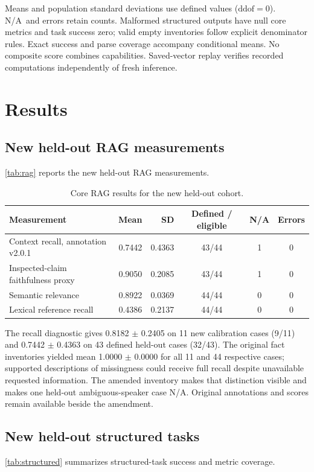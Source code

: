 \documentclass{amsart}
\theoremstyle{definition}
\numberwithin{equation}{section}
\newcommand{\NAAA}{\textnormal{N/A}}
\begin{document}
Means and population standard deviations use defined values ($\mathrm{ddof}=0$).
\NAAA\ and errors retain counts. Malformed structured outputs have null core
metrics and task success zero; valid empty inventories follow explicit denominator
rules. Exact success and parse coverage accompany conditional means. No composite
score combines capabilities. Saved-vector replay verifies recorded computations
independently of fresh inference.

\section{Results}\label{sec:results}
\subsection{New held-out RAG measurements}
\autoref{tab:rag} reports the new held-out RAG measurements.

\begin{table}[htbp]
\centering\small

\caption{Core RAG results for the new held-out cohort.}
\label{tab:rag}
\begin{tabularx}{\linewidth}{@{}>{\raggedright\arraybackslash}Xrrccc@{}}
\toprule
\textbf{Measurement} & \textbf{Mean} & \textbf{SD} & \textbf{Defined / eligible} & \textbf{N/A} & \textbf{Errors} \\
\midrule
Context recall, annotation v2.0.1 & 0.7442 & 0.4363 & 43/44 & 1 & 0 \\
Inspected-claim faithfulness proxy & 0.9050 & 0.2085 & 43/44 & 1 & 0 \\
Semantic relevance & 0.8922 & 0.0369 & 44/44 & 0 & 0 \\
Lexical reference recall & 0.4386 & 0.2137 & 44/44 & 0 & 0 \\
\bottomrule
\end{tabularx}
\end{table}
The recall diagnostic gives 0.8182 \(\pm\) 0.2405 on 11 new calibration cases (9/11) and 0.7442 \(\pm\) 0.4363 on 43 defined held-out cases (32/43). The original fact inventories yielded mean 1.0000 \(\pm\) 0.0000 for all 11 and 44 respective cases; supported descriptions of missingness could receive full recall despite unavailable requested information. The amended inventory makes that distinction visible and makes one held-out ambiguous-speaker case N/A. Original annotations and scores remain available beside the amendment.

\subsection{New held-out structured tasks}
\autoref{tab:structured} summarizes structured-task success and metric coverage.
\end{document}
